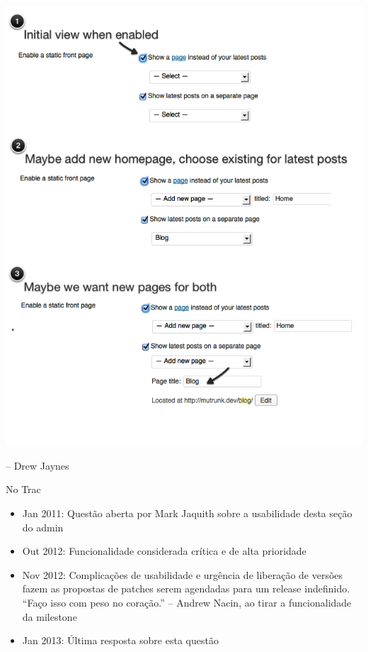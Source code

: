 \documentclass[handout]{beamer}
\begin{document}
\begin{frame}
\begin{center}
  \includegraphics[height=0.8\textheight]{./img/proposal-drew-jaynes.png}
\end{center}

-- Drew Jaynes

\end{frame}

\begin{frame}{No Trac}
\begin{itemize}
  \pause \item Jan 2011: Questão aberta por Mark Jaquith sobre a usabilidade
    desta seção do admin
  \pause \item Out 2012: Funcionalidade considerada crítica e de alta
    prioridade
  \pause \item Nov 2012: Complicações de usabilidade e urgência de liberação de
    versões fazem as propostas de patches serem agendadas para um release
    indefinido. ``Faço isso com peso no coração.'' -- Andrew Nacin, ao tirar a
    funcionalidade da milestone
  \pause \item Jan 2013: Última resposta sobre esta questão
\end{itemize}
\end{frame}
\end{document}
